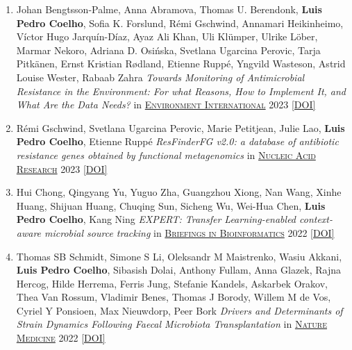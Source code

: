 \documentclass{article}
\newcommand\showdoi[1]{%
    \href{http://dx.doi.org/#1}{[DOI]}%
}
\newcommand\pubname[1]{\textsc{\uline{#1}}}
\begin{document}
\begin{enumerate}[resume]

\item Johan Bengtsson-Palme, Anna Abramova, Thomas U. Berendonk, \textbf{Luis Pedro Coelho}, Sofia K. Forslund, Rémi Gschwind, Annamari Heikinheimo, Víctor Hugo Jarquín-Díaz, Ayaz Ali Khan, Uli Klümper, Ulrike Löber, Marmar Nekoro, Adriana D. Osińska, Svetlana Ugarcina Perovic, Tarja Pitkänen, Ernst Kristian Rødland, Etienne Ruppé, Yngvild Wasteson, Astrid Louise Wester, Rabaab Zahra \emph{Towards Monitoring of Antimicrobial Resistance in the Environment: For what Reasons, How to Implement It, and What Are the Data Needs?} in \pubname{Environment International} 2023 \showdoi{10.1016/j.envint.2023.108089}

\item Rémi Gschwind, Svetlana Ugarcina Perovic, Marie Petitjean, Julie Lao, \textbf{Luis Pedro Coelho}, Etienne Ruppé \emph{ResFinderFG v2.0: a database of antibiotic resistance genes obtained by functional metagenomics} in \pubname{Nucleic Acid Research} 2023 \showdoi{10.1093/nar/gkad384}

\item Hui Chong, Qingyang Yu, Yuguo Zha, Guangzhou Xiong, Nan Wang, Xinhe Huang, Shijuan Huang, Chuqing Sun, Sicheng Wu, Wei-Hua Chen, \textbf{Luis Pedro Coelho}, Kang Ning \emph{EXPERT: Transfer Learning-enabled context-aware microbial source tracking} in \pubname{Briefings in Bioinformatics} 2022 \showdoi{10.1093/bib/bbac396}

\item Thomas SB Schmidt, Simone S Li, Oleksandr M Maistrenko, Wasiu Akkani, \textbf{Luis Pedro Coelho}, Sibasish Dolai, Anthony Fullam, Anna Glazek, Rajna Hercog, Hilde Herrema, Ferris Jung, Stefanie Kandels, Askarbek Orakov, Thea Van Rossum, Vladimir Benes, Thomas J Borody, Willem M de Vos, Cyriel Y Ponsioen, Max Nieuwdorp, Peer Bork \emph{Drivers and Determinants of Strain Dynamics Following Faecal Microbiota Transplantation} in \pubname{Nature Medicine} 2022 \showdoi{10.1038/s41591-022-01913-0}


\end{enumerate}
\end{document}
